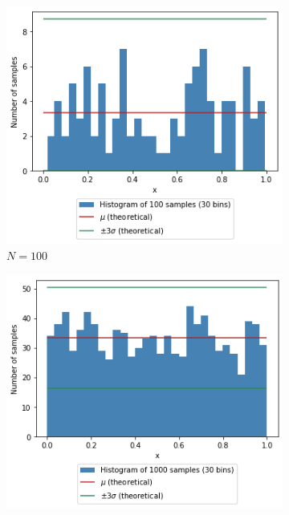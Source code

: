 \documentclass[a4paper]{article}
\begin{document}
\begin{figure}[h]
    \centering
    \begin{subfigure}[b]{0.3\textwidth}
        \centering
        \includegraphics[width=\textwidth]{figures/uniform_histogram_100.png}
        \caption{$N=100$}
        \label{fig:uniform_histogram_100}
    \end{subfigure}
    \hfill
    \begin{subfigure}[b]{0.3\textwidth}
        \centering
        \includegraphics[width=\textwidth]{figures/uniform_histogram_1000.png}

\end{subfigure}
\end{figure}
\end{document}
